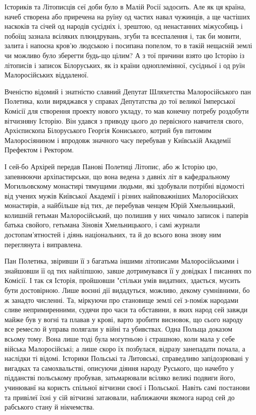 Істориків та Літописців сеї доби було в Малій Росії задосить. Але як ця країна,
начеб створена або приречена на руїну од частих навал чужинців, а ще частіших
наскоків та січей од народів сусідніх і, зрештою, од ненастанних міжусобиць і
побоїщ зазнала всіляких плюндрувань, згуби та всеспалення і, так би мовити,
залита і напоєна кров'ю людською і посипана попелом, то в такій нещасній землі
чи можливо було зберегти будь-що цілим? А з тої причини взято цю Історію із
літописів і записок Білоруських, як із країни одноплемінної, сусідньої і од
руїн Малоросійських віддаленої.

Вченістю відомий і знатністю славний Депутат Шляхетства Малоросійського пан
Полетика, коли виряджався у справах Депутатства до тої великої Імперської
Комісії для створення проекту нового укладу, то мав конечну потребу роздобути
вітчизняну Історію. Він удався з приводу цього до первісного навчителя свого,
Архієпископа Білоруського Георгія Кониського, котрий був питомим Малоросіянином
і впродовж значного часу перебував у Київській Академії Префектом і Ректором.

І сей-бо Архірей передав Панові Полетиці Літопис, або ж Історію цю, запевнюючи
архіпастирськи, що вона ведена з давніх літ в кафедральному Могильовскому
монастирі тямущими людьми, які здобували потрібні відомості від учених мужів
Київської Академії і різних найповажніших Малоросійских монастирів, а найбільше
від тих, де перебував ченцем Юрій Хмельницький, колишній гетьман
Малоросійський, що полишив у них чимало записок і паперів батька свойого,
гетьмана Зіновія Хмельницького, і самі журнали достопам'ятностей і діянь
національних, та й до всього вона знову ним переглянута і виправлена.

Пан Полетика, звіривши її з багатьма іншими літописами Малоросійськими і
знайшовши її од тих найліпшою, завше дотримувався її у довідках І писаннях по
Комісії. І так ся Історія, пройшовши "стільки умів видатних, здається, мусить
бути достовірною. Лише воєнні дії видадуться, можливо, декому сумнівними, бо ж
занадто численні. Та, міркуючи про становище землі сеї з-поміж народами сливе
непримиренними, судячи про часи та обставини, в яких народ сей завжди майже був
у вогні та плавав у крові, варто зробити висновок, що сього народу все ремесло
й управа полягали у війні та убивствах. Одна Польща доказом всьому тому. Вона
лише тоді була могутньою і страшною, коли мала у себе війська Малоросійські; а
лише скоро їх позбулася, відразу занепадати почала, а наслідки ті відомі.
Історики Польські та Литовські, справедливо запідозрювані у вигадках та
самохвальстві, описуючи діяння народу Руського, що начебто у підданстві
польському пробував, затьмарювали всіляко великі подвиги його, учинюванї на
користь спільної вітчизни своєї і Польської. Навіть самі постанови та привілеї
їхні у сій вітчизні затаювали, наближаючи якомога народ сей до рабського стану
й нікчемства. 

